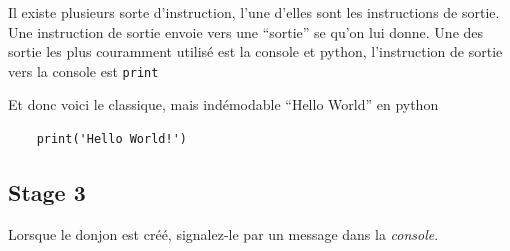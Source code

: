 \documentclass[12pt,a4paper]{book}
\newcommand{\codeintext}[1]{\texttt{#1}}
\begin{document}
Il existe plusieurs sorte d’instruction, l’une d’elles sont les instructions de sortie.
Une instruction de sortie envoie vers une “sortie” se qu’on lui donne.
Une des sortie les plus couramment utilisé est la console et python, l’instruction de sortie vers la console est \codeintext{print}

Et donc voici le classique, mais indémodable “Hello World” en python

\begin{lstlisting}
    print('Hello World!')
\end{lstlisting}


\subsection{Stage 3}
Lorsque le donjon est créé, signalez-le par un message dans la \emph{console}.
\end{document}
